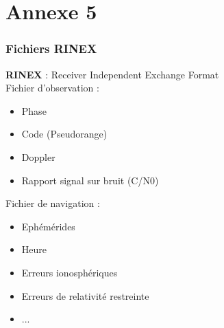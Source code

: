 \documentclass[xcolor=dvipsnames,envcountsect]{beamer}
\begin{document}
\section{Annexe 5}
\begin{frame}
	\label{appendix:5}
	\frametitle{Fichiers RINEX}
	\textbf{RINEX} : Receiver Independent Exchange Format \\
	Fichier d'observation : \\
	\begin{itemize}
		\item Phase
		\item Code (Pseudorange)
		\item Doppler
		\item Rapport signal sur bruit (C/N0) 
	\end{itemize}
	Fichier de navigation : \\
	\begin{itemize}
		\item Ephémérides
		\item Heure
		\item Erreurs ionosphériques
		\item Erreurs de relativité restreinte
		\item ...
	\end{itemize}
\end{frame}
\end{document}

